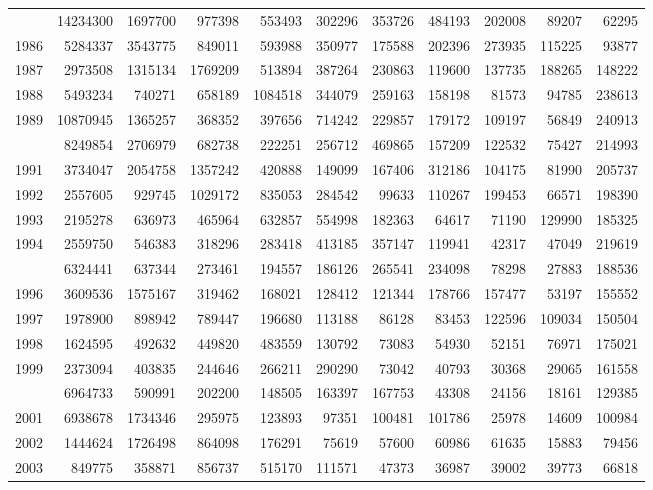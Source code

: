 \documentclass[
]{article}
\begin{document}
\begin{longtable}[t]{lrrrrrrrrrr}
\addlinespace
1985 & 14234300 & 1697700 & 977398 & 553493 & 302296 & 353726 & 484193 & 202008 & 89207 & 62295\\
1986 & 5284337 & 3543775 & 849011 & 593988 & 350977 & 175588 & 202396 & 273935 & 115225 & 93877\\
1987 & 2973508 & 1315134 & 1769209 & 513894 & 387264 & 230863 & 119600 & 137735 & 188265 & 148222\\
1988 & 5493234 & 740271 & 658189 & 1084518 & 344079 & 259163 & 158198 & 81573 & 94785 & 238613\\
1989 & 10870945 & 1365257 & 368352 & 397656 & 714242 & 229857 & 179172 & 109197 & 56849 & 240913\\
\addlinespace
1990 & 8249854 & 2706979 & 682738 & 222251 & 256712 & 469865 & 157209 & 122532 & 75427 & 214993\\
1991 & 3734047 & 2054758 & 1357242 & 420888 & 149099 & 167406 & 312186 & 104175 & 81990 & 205737\\
1992 & 2557605 & 929745 & 1029172 & 835053 & 284542 & 99633 & 110267 & 199453 & 66571 & 198390\\
1993 & 2195278 & 636973 & 465964 & 632857 & 554998 & 182363 & 64617 & 71190 & 129990 & 185325\\
1994 & 2559750 & 546383 & 318296 & 283418 & 413185 & 357147 & 119941 & 42317 & 47049 & 219619\\
\addlinespace
1995 & 6324441 & 637344 & 273461 & 194557 & 186126 & 265541 & 234098 & 78298 & 27883 & 188536\\
1996 & 3609536 & 1575167 & 319462 & 168021 & 128412 & 121344 & 178766 & 157477 & 53197 & 155552\\
1997 & 1978900 & 898942 & 789447 & 196680 & 113188 & 86128 & 83453 & 122596 & 109034 & 150504\\
1998 & 1624595 & 492632 & 449820 & 483559 & 130792 & 73083 & 54930 & 52151 & 76971 & 175021\\
1999 & 2373094 & 403835 & 244646 & 266211 & 290290 & 73042 & 40793 & 30368 & 29065 & 161558\\
\addlinespace
2000 & 6964733 & 590991 & 202200 & 148505 & 163397 & 167753 & 43308 & 24156 & 18161 & 129385\\
2001 & 6938678 & 1734346 & 295975 & 123893 & 97351 & 100481 & 101786 & 25978 & 14609 & 100984\\
2002 & 1444624 & 1726498 & 864098 & 176291 & 75619 & 57600 & 60986 & 61635 & 15883 & 79456\\
2003 & 849775 & 358871 & 856737 & 515170 & 111571 & 47373 & 36987 & 39002 & 39773 & 66818\\

\end{longtable}
\end{document}
